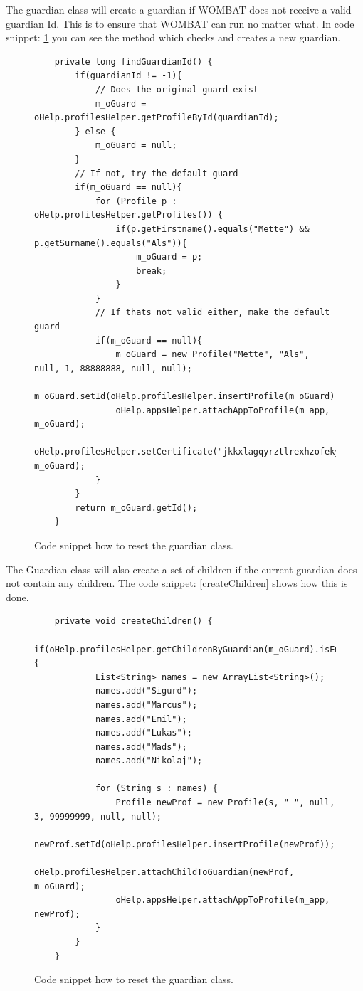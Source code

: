 \begin{description}
The guardian class will create a guardian if WOMBAT does not receive a valid guardian Id. This is to ensure that WOMBAT can run no matter what. In code snippet: \ref{code:createGuardian} you can see the method which checks and creates a new guardian.

\begin{figure}[H]
\begin{lstlisting}
	private long findGuardianId() {
		if(guardianId != -1){
			// Does the original guard exist
			m_oGuard = oHelp.profilesHelper.getProfileById(guardianId);
		} else {
			m_oGuard = null;
		}
		// If not, try the default guard
		if(m_oGuard == null){
			for (Profile p : oHelp.profilesHelper.getProfiles()) {
				if(p.getFirstname().equals("Mette") && p.getSurname().equals("Als")){
					m_oGuard = p;
					break;
				}
			}
			// If thats not valid either, make the default guard
			if(m_oGuard == null){
				m_oGuard = new Profile("Mette", "Als", null, 1, 88888888, null, null);				
				m_oGuard.setId(oHelp.profilesHelper.insertProfile(m_oGuard));
				oHelp.appsHelper.attachAppToProfile(m_app, m_oGuard);
				oHelp.profilesHelper.setCertificate("jkkxlagqyrztlrexhzofekyzrnppajeobqxcmunkqhsbrgpxdtqgygnmbhrgnpphaxsjshlpupgakmirhpyfaivvtpynqarxsghhilhkqvpelpreevykxurtppcggkzfaepihlodgznrmbrzgqucstflhmndibuymmvwauvdlyqnnlxkurinuypmqypspmkqavuhfwsh", m_oGuard);
			}
		} 
		return m_oGuard.getId();
	}
\end{lstlisting}
\caption{Code snippet how to reset the guardian class.}%
\label{code:createGuardian}%
\end{figure}

The Guardian class will also create a set of children if the current guardian does not contain any children. The code snippet: \ref{createChildren} shows how this is done.
	
	\begin{figure}[H]
\begin{lstlisting}
	private void createChildren() {		
		if(oHelp.profilesHelper.getChildrenByGuardian(m_oGuard).isEmpty()){
			List<String> names = new ArrayList<String>();
			names.add("Sigurd");
			names.add("Marcus");
			names.add("Emil");
			names.add("Lukas");
			names.add("Mads");
			names.add("Nikolaj");
			
			for (String s : names) {
				Profile newProf = new Profile(s, " ", null, 3, 99999999, null, null);
				newProf.setId(oHelp.profilesHelper.insertProfile(newProf));
				oHelp.profilesHelper.attachChildToGuardian(newProf, m_oGuard);
				oHelp.appsHelper.attachAppToProfile(m_app, newProf);
			}
		}
	}
\end{lstlisting}
\caption{Code snippet how to reset the guardian class.}%
\label{code:createChildren}%
\end{figure}


\end{description}
